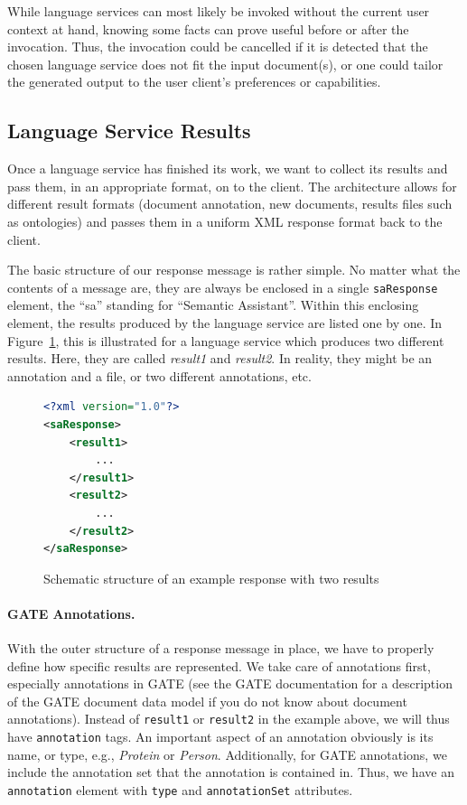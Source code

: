 While language services can most likely be invoked without the current
user context at hand, knowing some facts can prove useful before or
after the invocation. Thus, the invocation could be cancelled if it
is detected that the chosen language service does not fit the input
document(s), or one could tailor the generated output to the user
client's preferences or capabilities.


\subsection{Language Service Results}
\label{sec:response}
Once a language service has finished its work, we want to collect its
results and pass them, in an appropriate format, on to the client. The
\sa architecture allows for different result formats (document
annotation, new documents, results files such as ontologies) and
passes them in a uniform XML response format back to the client.

The basic structure of our response message is rather simple. No
matter what the contents of a message are, they are always be enclosed
in a single \texttt{saResponse} element, the ``sa'' standing for
``Semantic Assistant''. Within this enclosing element, the results
produced by the language service are listed one by one. In
Figure~\ref{list:response1}, this is illustrated for a language
service which produces two different results. Here, they are called
\emph{result1} and \emph{result2}. In reality, they might be an
annotation and a file, or two different annotations, etc.

\begin{figure}[htb]
\begin{lstlisting}[language=XML,xleftmargin=8mm,columns=flexible]
<?xml version="1.0"?>
<saResponse>
    <result1>
        ...
    </result1>
    <result2>
        ...
    </result2>
</saResponse>
\end{lstlisting}
\caption{Schematic structure of an example response with two results}
\label{list:response1}
\end{figure}


\paragraph{GATE Annotations.} With the outer structure of a response
message in place, we have to properly define how specific results are
represented. We take care of annotations first, especially annotations
in GATE (see the GATE documentation for a description of the GATE
document data model if you do not know about document annotations).
Instead of \texttt{result1} or \texttt{result2} in the example above,
we will thus have \texttt{annotation} tags. An important aspect of an
annotation obviously is its name, or type, e.g., \emph{Protein} or
\emph{Person}.  Additionally, for GATE annotations, we include the
annotation set that the annotation is contained in. Thus, we have an
\texttt{annotation} element with \texttt{type} and
\texttt{annotationSet} attributes.

